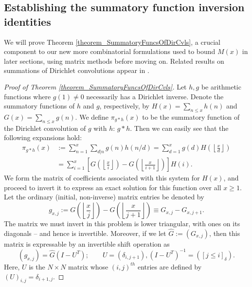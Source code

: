 \documentclass[11pt,reqno,a4letter]{article}
\numberwithin{figure}{section}
\numberwithin{table}{section}
\newcommand{\cf}{\textit{cf.\ }}
\newcommand{\Iverson}[1]{\ensuremath{\left[#1\right]_{\delta}}}
\newcommand{\floor}[1]{\left\lfloor #1 \right\rfloor}
\theoremstyle{plain}
\numberwithin{theorem}{section}
\theoremstyle{definition}
\begin{document}
\subsection{Establishing the summatory function inversion identities} 

We will prove Theorem \ref{theorem_SummatoryFuncsOfDirCvls}, a crucial component to our new more combinatorial 
formulations used to bound $M(x)$ in later sections, using matrix methods before moving on. 
Related results on summations of Dirichlet convolutions appear in 
\cite[\S 2.14; \S 3.10; \S 3.12; \cf \S 4.9, p.\ 95]{APOSTOLANUMT}. 

\begin{proof}[Proof of Theorem \ref{theorem_SummatoryFuncsOfDirCvls}] 
\label{proofOf_theorem_SummatoryFuncsOfDirCvls} 
Let $h,g$ be arithmetic functions where $g(1) \neq 0$ 
necessarily has a Dirichlet inverse. Denote the summatory functions of $h$ and $g$, 
respectively, by $H(x) = \sum_{n \leq x} h(n)$ and $G(x) = \sum_{n \leq x} g(n)$. 
We define $\pi_{g \ast h}(x)$ to be the summatory function of the 
Dirichlet convolution of $g$ with $h$: $g \ast h$. 
Then we can easily see that the following expansions hold: 
\begin{align*} 
\pi_{g \ast h}(x) & := \sum_{n=1}^{x} \sum_{d|n} g(n) h(n/d) = \sum_{d=1}^x g(d) H\left(\floor{\frac{x}{d}}\right) \\ 
     & = \sum_{i=1}^x \left[G\left(\floor{\frac{x}{i}}\right) - G\left(\floor{\frac{x}{i+1}}\right)\right] H(i). 
\end{align*} 
We form the matrix of coefficients associated with this system for $H(x)$, and proceed to invert it to express an 
exact solution for this function over all $x \geq 1$. Let the ordinary (initial, non-inverse) matrix entries be denoted by 
\[
g_{x,j} := G\left(\floor{\frac{x}{j}}\right) - G\left(\floor{\frac{x}{j+1}}\right) \equiv G_{x,j} - G_{x,j+1}. 
\]
The matrix we must invert in this problem is lower triangular, with ones on its diagonals -- and hence is invertible. 
Moreover, if we let $\hat{G} := (G_{x,j})$, then this matrix is 
expressable by an invertible shift operation as 
\[
(g_{x,j}) = \hat{G} (I - U^{T}); \qquad U = (\delta_{i,j+1}), (I - U^T)^{-1} = (\Iverson{j \leq i}). 
\]
Here, $U$ is the $N \times N$ matrix whose $(i,j)^{th}$ entries are defined by 
$(U)_{i,j} = \delta_{i+1,j}$. 


\end{proof}
\end{document}
